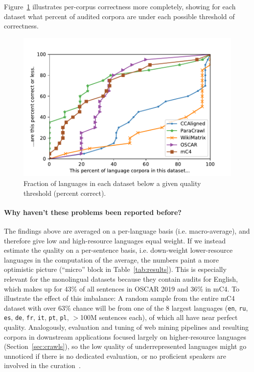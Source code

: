 Figure~\ref{fig:ratio_c} illustrates per-corpus correctness more completely, showing for each dataset what percent of audited corpora are under each possible threshold of correctness.

\begin{figure}[th!]
    \centering
    \includegraphics[width=\columnwidth]{static/media/oscar/quality/num_C_ratio.pdf}
    \caption{Fraction of languages in each dataset below a given quality threshold (percent correct).}%
    \label{fig:ratio_c}
\end{figure}

\paragraph{Why haven't these problems been reported before?}
The findings above are averaged on a per-language basis (i.e. macro-average), and therefore give low and high-resource languages equal weight. If we instead estimate the quality on a per-sentence basis, i.e. down-weight lower-resource languages in the computation of the average, the numbers paint a more optimistic picture (``micro'' block in Table~\ref{tab:results}). This is especially relevant for the monolingual datasets because they contain audits for English, which makes up for 43\% of all sentences in OSCAR 2019 and 36\% in mC4. To illustrate the effect of this imbalance: A random sample from the entire mC4 dataset with over 63\% chance will be from one of the 8 largest languages (\texttt{en}, \texttt{ru}, \texttt{es}, \texttt{de}, \texttt{fr}, \texttt{it}, \texttt{pt}, \texttt{pl}, $>$100M sentences each), %
of which all have near perfect quality. Analogously, evaluation and tuning of web mining pipelines and resulting corpora in downstream applications focused largely on higher-resource languages (Section~\ref{sec:crawls}), so the low quality of underrepresented languages might go unnoticed if there is no dedicated evaluation, or no proficient speakers are involved in the curation~\citep{nekoto-etal-2020-participatory}.


